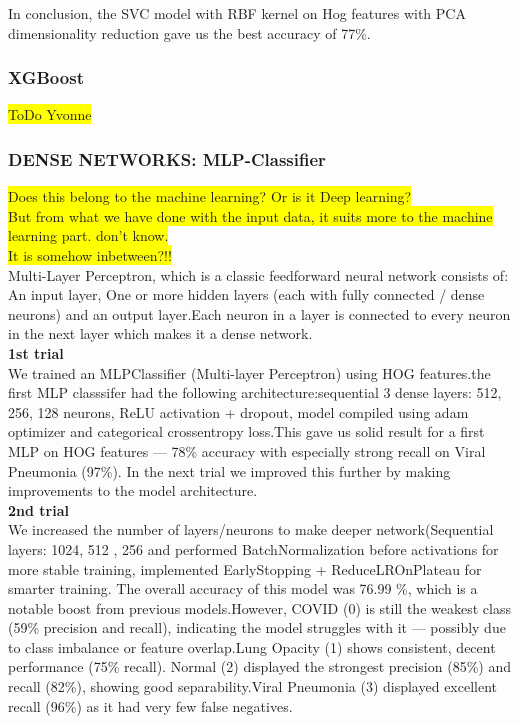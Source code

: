 \documentclass{article}
\begin{document}
In conclusion, the SVC model with RBF kernel on Hog features with PCA dimensionality reduction gave us the best accuracy of 77\%.

\subsubsection{XGBoost}
\colorbox{yellow}{ToDo Yvonne}

\subsubsection {DENSE NETWORKS: MLP-Classifier} 
\colorbox{yellow}{Does this belong to the machine learning? Or is it Deep learning?}\\
\colorbox{yellow}{But from what we have done with the input data, it suits more to the machine learning part. don't know.}\\
\colorbox{yellow}{It is somehow inbetween?!!}\\
 Multi-Layer Perceptron, which is a classic feedforward neural network consists of: An input layer, One or more hidden layers (each with fully connected / dense neurons) and an output layer.Each neuron in a layer is connected to every neuron in the next layer which makes it a dense network.\\
 
\textbf{1st trial }\\We trained an MLPClassifier (Multi-layer Perceptron) using HOG features.the first MLP classsifer had the following architecture:sequential 3 dense layers: 512, 256, 128 neurons, ReLU activation + dropout, model compiled using adam optimizer and categorical crossentropy loss.This gave us solid result for a first MLP on HOG features — 78\% accuracy with especially strong recall on Viral Pneumonia (97\%).
In the next trial we improved this further by making improvements to the model architecture.\\

\textbf{2nd trial }\\
We increased the number of layers/neurons to make deeper network(Sequential layers: 1024, 512 , 256
and performed BatchNormalization before activations for more stable training, implemented EarlyStopping + ReduceLROnPlateau for smarter training.
The overall accuracy of this model was 76.99 \%, which is a notable boost from previous models.However, COVID (0) is still the weakest class (59\% precision and recall), indicating the model struggles with it — possibly due to class imbalance or feature overlap.Lung Opacity (1) shows consistent, decent performance (75\% recall). Normal (2) displayed the strongest precision (85\%) and recall (82\%), showing good separability.Viral Pneumonia (3) displayed excellent recall (96\%) as it had very few false negatives.\\
\end{document}
